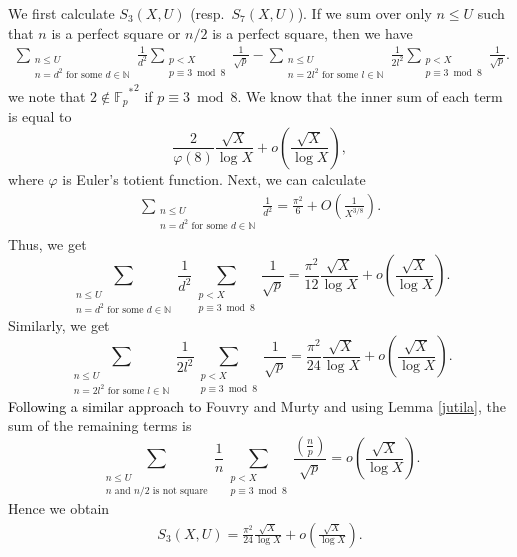 \documentclass[a4paper, 11pt]{article}
\theoremstyle{plain}
\newcommand{\?}{\textcolor{red}{??}}
\newcommand{\fp}{\mathbb{F}_p}
\newcommand{\bN}{\mathbb{N}}
\begin{document}
We first calculate $S_3(X,U)$ (resp.\ $S_7(X,U)$). If we sum over only $n \le U$ such that $n$ is a perfect square or $n/2$ is a perfect square, then we have 
    \begin{eqnarray*}
    \sum_{\substack{n \le U \\ n=d^2 \text{ for some } d \in \bN }} \frac{1}{d^2} \sum_{\substack{p<X \\ p \equiv 3 \bmod 8 }} \frac{1}{\sqrt{p}}-\sum_{\substack{n \le U \\ n=2l^2 \text{ for some } l \in \bN }} \frac{1}{2l^2} \sum_{\substack{p<X \\ p \equiv 3 \bmod 8}} \frac{1}{\sqrt{p}}.
    \end{eqnarray*}
we note that $2 \notin {{\fp}^{*}}^2$ if $p \equiv 3 \bmod 8$. 
We know that the inner sum of each term is equal to
\[
\frac{2}{\varphi(8)} \frac{\sqrt{X}}{\log X} +o \left( \frac{\sqrt{X}}{\log X} \right),
\]
where $\varphi$ is Euler's totient function. Next, we can calculate 
\begin{eqnarray*}
    \sum_{\substack{n \le U \\ n=d^2 \text{ for some } d \in \bN }} \frac{1}{d^2}=\frac{{\pi}^2}{6}+O\left( \frac{1}{X^{3/8}} \right).
\end{eqnarray*}
Thus, we get
\[
 \sum_{\substack{n \le U \\ n=d^2 \text{ for some } d \in \bN }} \frac{1}{d^2} \sum_{\substack{p<X \\ p \equiv 3 \bmod 8 }} \frac{1}{\sqrt{p}}=\frac{{\pi}^2}{12} \frac{\sqrt{X}}{\log X} +o \left( \frac{\sqrt{X}}{\log X} \right).
\]
Similarly, we get 
\[
\sum_{\substack{n \le U \\ n=2l^2 \text{ for some } l \in \bN }} \frac{1}{2l^2} \sum_{\substack{p<X \\ p \equiv 3 \bmod 8 }} \frac{1}{\sqrt{p}}=\frac{{\pi}^2}{24} \frac{\sqrt{X}}{\log X} +o \left( \frac{\sqrt{X}}{\log X} \right).
\]
\textcolor{black}{Following a similar approach to} Fouvry and Murty \cite[p.\ 92]{FM01} and using Lemma \ref{jutila}, the sum of the remaining terms is 
\[
\sum_{\substack{n \le U \\ n \text{ and } n/2 \text{ is not square}}} \frac{1}{n} \sum_{\substack{p<X \\ p \equiv 3 \bmod 8}}\frac{\left( \frac{n}{p} \right)}{\sqrt{p}} =o \left( \frac{\sqrt{X}}{\log X} \right).
\]
Hence we obtain
\begin{eqnarray}
\label{3mod8}
    S_3(X,U)=\frac{{\pi}^2}{24} \frac{\sqrt{X}}{\log X} +o \left( \frac{\sqrt{X}}{\log X} \right).
\end{eqnarray}
\end{document}
